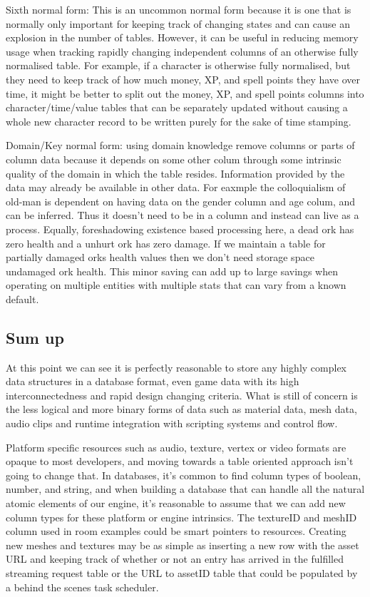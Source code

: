 Sixth normal form: This is an uncommon normal form because it is one that is
normally only important for keeping track of changing states and can cause an
explosion in the number of tables. However, it can be useful in reducing memory
usage when tracking rapidly changing independent columns of an otherwise fully
normalised table. For example, if a character is otherwise fully normalised,
but they need to keep track of how much money, XP, and spell points they have
over time, it might be better to split out the money, XP, and spell points
columns into character/time/value tables that can be separately updated without
causing a whole new character record to be written purely for the sake of time
stamping.

Domain/Key normal form: using domain knowledge remove columns or parts of
column data because it depends on some other colum through some intrinsic
quality of the domain in which the table resides. Information provided by the
data may already be available in other data. For eaxmple the colloquialism of
old-man is dependent on having data on the gender column and age colum, and can
be inferred. Thus it doesn't need to be in a column and instead can live as a
process. Equally, foreshadowing existence based processing here, a dead ork has
zero health and a unhurt ork has zero damage. If we maintain a table for
partially damaged orks health values then we don't need storage space undamaged
ork health. This minor saving can add up to large savings when operating on
multiple entities with multiple stats that can vary from a known default.

\subsection{Sum up}

At this point we can see it is perfectly reasonable to store any highly complex data
structures in a database format, even game data with its high
interconnectedness and rapid design changing criteria.
What is still of concern is the less logical and more binary forms of data such
as material data, mesh data, audio clips and runtime integration with scripting
systems and control flow.

Platform specific resources such as audio, texture, vertex or video formats are
opaque to most developers, and moving towards a table oriented approach isn't
going to change that. In databases, it's common to find column types of
boolean, number, and string, and when building a database that can handle all
the natural atomic elements of our engine, it's reasonable to assume that we
can add new column types for these platform or engine intrinsics.  The
textureID and meshID column used in room examples could be smart pointers to
resources. Creating new meshes and textures may be as simple as inserting a new
row with the asset URL and keeping track of whether or not an entry has arrived
in the fulfilled streaming request table or the URL to assetID table that could
be populated by a behind the scenes task scheduler.

